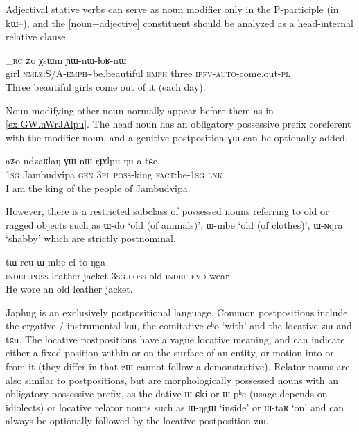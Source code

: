 \documentclass[oldfontcommands,oneside,a4paper,11pt]{article}
\newcommand{\ipa}[1]{{\phon #1}} %
\begin{document}
Adjectival stative verbs can serve as noun modifier only in the P-participle (in \ipa{kɯ--}), and the [noun+adjective] constituent should be analyzed as a head-internal relative clause.

\begin{exe}
\ex \label{ex:tCheme.XsWm}
\gll
[\ipa{tɕʰeme}^{head} 	\ipa{kɯ-mpɕɯ\textasciitilde{}mpɕɤr}]_{\textsc{rc}} 	\ipa{ʑo} 	\ipa{χsɯm} 	\ipa{ɲɯ-nɯ-ɬoʁ-nɯ}  \\
girl \textsc{nmlz:S/A-emph}\textasciitilde{}be.beautiful \textsc{emph} three \textsc{ipfv-auto}-come.out-\textsc{pl} \\
\glt Three beautiful girls come out of it (each day).
\end{exe}

Noun modifying other noun normally appear before them as in \ref{ex:GW.nWrJAlpu}. The head noun has an obligatory possessive prefix coreferent with the modifier noun, and a genitive postposition \ipa{ɣɯ} can be optionally added.

\begin{exe}
\ex \label{ex:GW.nWrJAlpu}
\gll
\ipa{aʑo}  	\ipa{ndzaʁlaŋ}  	\ipa{ɣɯ}  	\ipa{nɯ-rɟɤlpu}  	\ipa{ŋu-a}  	\ipa{tɕe,}  
 \\
\textsc{1sg} Jambudvîpa \textsc{gen} \textsc{3pl.poss}-king \textsc{fact}:be-\textsc{1sg} \textsc{lnk} \\
\glt I am the king of the people of Jambudvîpa.
\end{exe}

However, there is a  restricted subclass of possessed nouns referring to old or ragged objects such as \ipa{ɯ-do} `old (of animals)', \ipa{ɯ-mbe} `old (of clothes)', \ipa{ɯ-ɴqra} `shabby' which are strictly postnominal.


\begin{exe}
\ex \label{ex:Wmbe}
\gll
\ipa{tɯ-rcu} 	\ipa{ɯ-mbe} 	\ipa{ci} 	\ipa{to-ŋga} \\
\textsc{indef.poss}-leather.jacket \textsc{3sg.poss}-old \textsc{indef} \textsc{evd}-wear \\
\glt He wore an old leather jacket.
\end{exe}

Japhug is an exclusively postpositional language. Common postpositions include the ergative / instrumental \ipa{kɯ}, the comitative \ipa{cʰo} `with' and the locative \ipa{zɯ} and \ipa{tɕu}. The locative postpositions have a vague locative meaning, and can indicate either a fixed position within or on the surface of an entity, or motion into or from it (they differ in that \ipa{zɯ} cannot follow a demonstrative). Relator nouns are also similar to postpositions, but are morphologically possessed nouns with an obligatory possessive prefix, as the dative \ipa{ɯ-ɕki} or \ipa{ɯ-pʰe} (usage depends on  idiolects) or locative relator nouns such as \ipa{ɯ-ŋgɯ} `inside' or \ipa{ɯ-taʁ} `on' and can always be optionally followed by the locative postposition \ipa{zɯ}.
\end{document}
